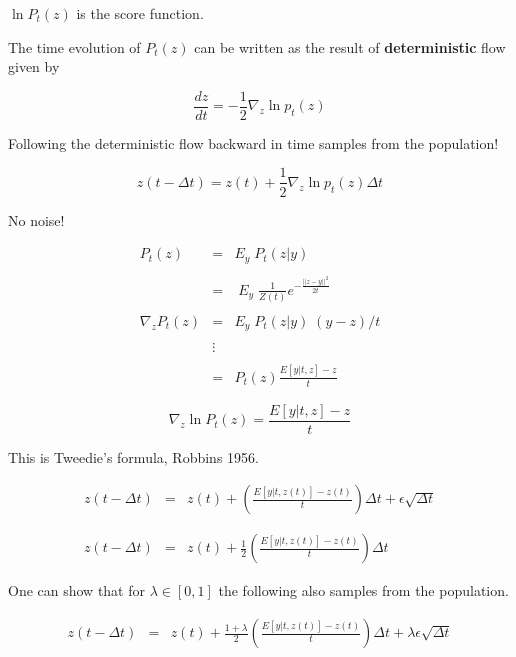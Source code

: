 {\vfill
$\ln P_t(z)$ is the score function.

\vfill
The time evolution of $P_t(z)$ can be written as the result of {\bf deterministic} flow given by

$$\frac{dz}{dt} = - \frac{1}{2}\nabla_z \ln p_t(z)$$


Following the deterministic flow backward in time samples from the population!

$$z(t-\Delta t) = z(t) + \frac{1}{2} \nabla_z \ln p_t(z) \Delta t$$

\vfill
No noise!


{\Large
\begin{eqnarray*}
  P_t(z) & = & E_y \;P_t(z|y) \\
  \\
  & = & \;E_y\;\frac{1}{Z(t)} e^{-\frac{||z-y||^2}{2t}} \\
  \\
  \nabla_z P_t(z) & = & E_y \;P_t(z|y)\; (y-z)/t \\
  \\
 & \vdots & \\
  \\
  & = & P_t(z)\frac{E[y|t,z]-z}{t}
  \end{eqnarray*}
}

 {\color{red}
 $$\nabla_z \ln P_t(z)  = \frac{E[y|t,z]-z}{t}$$
 }

This is Tweedie's formula, Robbins 1956.


\begin{eqnarray*}
z(t - \Delta t) & = & z(t) + \left(\frac{E[y|t,z(t)] - z(t)}{t}\right)\Delta t + \epsilon\sqrt{\Delta t} \\
\\
\\
z(t -\Delta t) & = & z(t) + \frac{1}{2}\left(\frac{E[y|t,z(t)] - z(t)}{t}\right)\Delta t
\end{eqnarray*}

One can show that for $\lambda \in [0,1]$ the following also samples from the population.

\begin{eqnarray*}
z(t -\Delta t) & = & z(t) + \frac{1+\lambda}{2}\left(\frac{E[y|t,z(t)] - z(t)}{t}\right)\Delta t + \lambda \epsilon\sqrt{\Delta t}
\end{eqnarray*}

}


